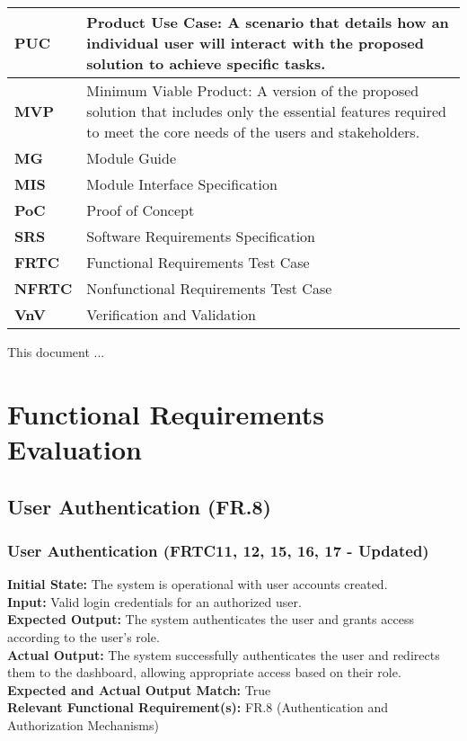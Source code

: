 \documentclass[12pt, titlepage]{article}
\begin{document}
\begin{longtable}[c]{|p{}|p{}|}
  \textbf{PUC} & Product Use Case: A scenario that details how an individual user will interact with the proposed solution to achieve specific tasks. \\ \hline
  \textbf{MVP} & Minimum Viable Product: A version of the proposed solution that includes only the essential features required to meet the core needs of the users and stakeholders. \\ \hline
  \textbf{MG} & Module Guide \\ \hline
  \textbf{MIS} & Module Interface Specification \\ \hline
  \textbf{PoC} & Proof of Concept \\ \hline
  \textbf{SRS} & Software Requirements Specification \\ \hline
  \textbf{FRTC} & Functional Requirements Test Case \\ \hline
  \textbf{NFRTC} & Nonfunctional Requirements Test Case \\ \hline
  \textbf{VnV} & Verification and Validation \\ \hline
\end{longtable}

\newpage

\tableofcontents

\listoftables %

\listoffigures %

\newpage


This document ...

\section{Functional Requirements Evaluation}

\subsection{User Authentication (FR.8)}
\subsubsection{User Authentication (FRTC11, 12, 15, 16, 17 - Updated)}
\textbf{Initial State:} The system is operational with user accounts created.\\
\textbf{Input:} Valid login credentials for an authorized user.\\
\textbf{Expected Output:} The system authenticates the user and grants access according to the user's role.\\
\textbf{Actual Output:} The system successfully authenticates the user and redirects them to the dashboard, allowing appropriate access based on their role.\\
\textbf{Expected and Actual Output Match:} True\\
\textbf{Relevant Functional Requirement(s):} FR.8 (Authentication and Authorization Mechanisms)\\
\end{document}
